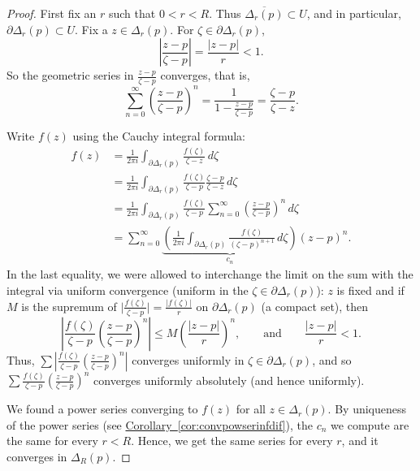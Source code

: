 \documentclass[12pt,openany]{book}
\newcommand{\sabs}[1]{\lvert {#1} \rvert}
\newcommand{\babs}[1]{\bigl\lvert {#1} \bigr\rvert}
\newcommand{\abs}[1]{\left\lvert {#1} \right\rvert}
\theoremstyle{plain}
\theoremstyle{remark}
\theoremstyle{definition}
\theoremstyle{exercise}
\theoremstyle{example}
\newcommand{\corref}[1]{\hyperref[#1]{Corollary~\ref*{#1}}}
\begin{document}
\begin{proof}
First fix an $r$ such that $0 < r < R$.
Thus $\overline{\Delta_r(p)} \subset U$, and in particular,
$\partial \Delta_r(p) \subset U$.
Fix a $z \in \Delta_r(p)$.
For $\zeta \in \partial \Delta_r(p)$, 
\begin{equation*}
\abs{\frac{z-p}{\zeta-p}} =
\frac{\sabs{z-p}}{r} < 1 .
\end{equation*}
So the geometric series in $\frac{z-p}{\zeta-p}$ converges, that is,
\begin{equation*}
\sum_{n=0}^\infty
{\left(\frac{z-p}{\zeta-p}\right)}^n
=
\frac{1}{1-\frac{z-p}{\zeta-p}}
=
\frac{\zeta-p}{\zeta-z} .
\end{equation*}

Write $f(z)$ using the Cauchy integral formula:
\begin{equation*}
\begin{split}
f(z)
& =
\frac{1}{2\pi i}
\int_{\partial \Delta_r(p)}
\frac{f(\zeta)}{\zeta-z}
\,
d \zeta 
\\
& =
\frac{1}{2\pi i}
\int_{\partial \Delta_r(p)}
\frac{f(\zeta)}{\zeta-p}
\frac{\zeta-p}{\zeta-z}
\,
d \zeta 
\\
& =
\frac{1}{2\pi i}
\int_{\partial \Delta_r(p)}
\frac{f(\zeta)}{\zeta-p}
\sum_{n=0}^\infty
{\left(\frac{z-p}{\zeta-p}\right)}^n
\,
d \zeta 
\\
& =
\sum_{n=0}^\infty
\underbrace{
\left(
\frac{1}{2\pi i}
\int_{\partial \Delta_r(p)}
\frac{f(\zeta)}{{(\zeta-p)}^{n+1}}
\,
d \zeta 
\right)
}_{c_n}
{(z-p)}^n .
\end{split}
\end{equation*}
In the last equality, we were allowed to 
interchange the limit on the sum with the integral
via uniform convergence (uniform in the $\zeta \in \partial \Delta_r(p)$):
$z$ is fixed and if $M$ is the supremum of $\babs{\frac{f(\zeta)}{\zeta-p}} =
\frac{\sabs{f(\zeta)}}{r}$ on $\partial \Delta_r(p)$ (a compact set),
then
\begin{equation*}
\abs{
\frac{f(\zeta)}{\zeta-p}
{\left(\frac{z-p}{\zeta-p}\right)}^n
}
\leq
M 
{\left(\frac{\abs{z-p}}{r}\right)}^n,
\qquad \text{and} \qquad
\frac{\abs{z-p}}{r} < 1 .
\end{equation*}
Thus, $\sum 
\abs{
\frac{f(\zeta)}{\zeta-p}
{\left(\frac{z-p}{\zeta-p}\right)}^n
}$ converges uniformly in $\zeta \in \partial \Delta_r(p)$, and so
$\sum 
\frac{f(\zeta)}{\zeta-p}
{\left(\frac{z-p}{\zeta-p}\right)}^n$ converges uniformly absolutely
(and hence uniformly).

We found a power series converging to $f(z)$ for all $z \in \Delta_r(p)$.
By uniqueness of the power series (see \corref{cor:convpowserinfdif}),
the $c_n$ we compute are the same for every $r < R$.  Hence,
we get the same series for every $r$, and it converges in $\Delta_R(p)$.
\end{proof}
\end{document}

